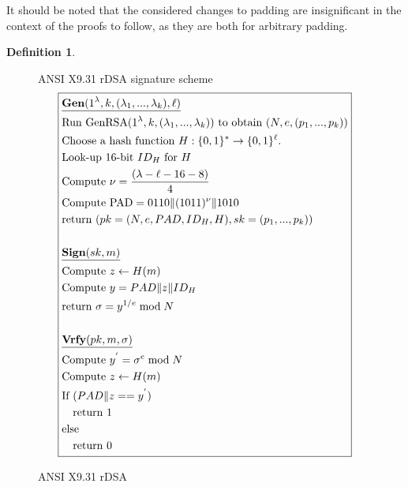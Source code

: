 \documentclass[]{final_report}
\theoremstyle{definition}
\newtheorem{definition}{Definition}[chapter]
\begin{document}
It should be noted that the considered changes to padding are insignificant in the context of the proofs to follow, as they are both for arbitrary padding.


\begin{definition}
\begin{figure}[H]
\centering
\hfill ANSI X9.31 rDSA signature scheme\hfill\phantom{} 
\[
\boxed{
\begin{aligned}
&\underline{\textbf{\text{Gen}} (1^\lambda, k, (\lambda_{1},...,\lambda_{k}), \ell)} \\
&\text{Run GenRSA}(1^\lambda, k, (\lambda_{1},...,\lambda_{k})) \text{ to obtain } (N, e,  (p_{1},...,p_{k})) \\
&\text{Choose a hash function } H : \{0, 1\}^* \rightarrow \{0, 1\}^\ell. \\
&\text{Look-up } 16\text{-bit } ID_{H} \text{ for } H \\
&\text{Compute } \nu = \frac{(\lambda - \ell - 16 - 8)}{4} \\
&\text{Compute PAD} = 0110 \| (1011)^{\nu} \| 1010 \\
&\text{return } (pk = (N, e, PAD, ID_{H}, H), sk =  (p_{1},...,p_{k})) \\
\\
&\underline{\textbf{\text{Sign}} (sk, m)} \\
&\text{Compute } z \leftarrow H(m) \\
&\text{Compute } y = PAD  \| z \| ID_{H} \\
&\text{return } \sigma = y^{1/e} \bmod N \\
\\
&\underline{\textbf{\text{Vrfy}} (pk, m, \sigma)} \\
&\text{Compute } y^{'} = \sigma^{e} \bmod N \\
&\text{Compute } z \leftarrow H(m) \\
&\text{If } (PAD \| z == y^{'}) \\
&\quad \text{return } 1 \\
&\text{else} \\
&\quad \text{return } 0 
\end{aligned}
}
\]
\caption{ANSI X9.31 rDSA}
\label{fig:ansix931}
\end{figure}
\end{definition}
\end{document}

